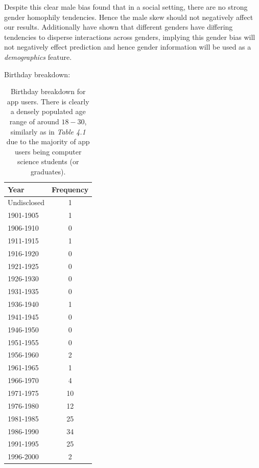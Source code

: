 Despite this clear male bias \cite{jugand} found that in a social setting, there are no strong gender homophily tendencies. Hence the male 
skew should not negatively affect our results. Additionally \cite{backstrom2011center} have shown that different genders have differing 
tendencies to disperse interactions across genders, implying this gender bias will not negatively effect prediction and hence gender information will 
be used as a \emph{demographics} feature.

\clearpage

Birthday breakdown:

\begin{table}[!htbp]
\centering
	\begin{tabular}{|l|c|} %
		\hline
		\textbf{Year} & \textbf{Frequency}  \\ \hline
		Undisclosed & 1 \\ \hline
		1901-1905 & 1 \\ \hline
		1906-1910 & 0 \\ \hline
		1911-1915 & 1 \\ \hline
		1916-1920 & 0 \\ \hline
		1921-1925 & 0 \\ \hline
		1926-1930 & 0 \\ \hline
		1931-1935 & 0 \\ \hline
		1936-1940 & 1 \\ \hline
		1941-1945 & 0 \\ \hline
		1946-1950 & 0 \\ \hline
		1951-1955 & 0 \\ \hline
		1956-1960 & 2 \\ \hline
		1961-1965 & 1 \\ \hline
		1966-1970 & 4 \\ \hline
		1971-1975 & 10 \\ \hline
		1976-1980 & 12 \\ \hline
		1981-1985 & 25 \\ \hline
		1986-1990 & 34 \\ \hline
		1991-1995 & 25 \\ \hline
		1996-2000 & 2 \\ \hline
	\end{tabular}
	\caption{Birthday breakdown for app users. There is clearly a densely populated age range of around $18 - 30$, similarly as in \emph{Table 4.1} due to the majority of app users being computer science students (or graduates).}
	\label{tab:revpol}
\end{table}

